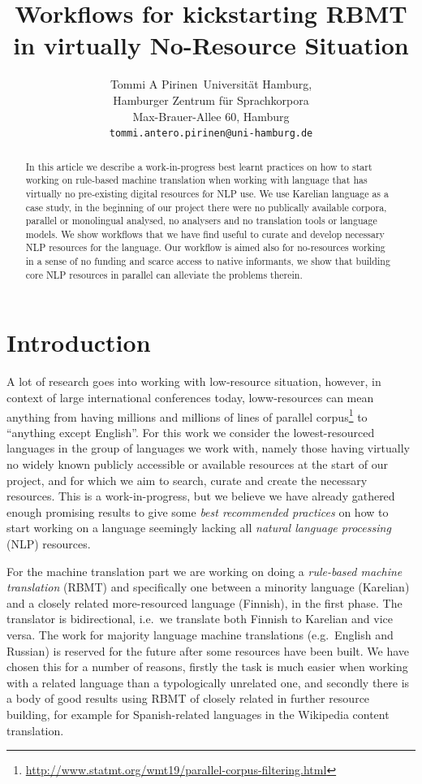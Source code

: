 \documentclass{flammie}
\title{Workflows for kickstarting RBMT in virtually No-Resource Situation}
\author{Tommi A Pirinen\
  Universität Hamburg,\\
  Hamburger Zentrum für Sprachkorpora\\
  Max-Brauer-Allee 60, Hamburg\\
  {\tt tommi.antero.pirinen@uni-hamburg.de}}
\date{}
\begin{document}
\maketitle
\begin{abstract}
    In this article we describe a work-in-progress best learnt practices on how
    to start working on rule-based machine translation when working with
    language that has virtually no pre-existing digital resources for NLP use.
    We use Karelian language as a case study, in the beginning of our project
    there were no publically available corpora, parallel or monolingual
    analysed, no analysers and no translation tools or language models. We show
    workflows that we have find useful to curate and develop necessary NLP
    resources for the language. Our workflow is aimed also for no-resources
    working in a sense of no funding and scarce access to native informants, we
    show that building core NLP resources in parallel can alleviate the problems
    therein.
\end{abstract}

\section{Introduction}

A lot of research goes into working with low-resource situation, however, in 
context of large international conferences today, loww-resources can mean
anything from having millions and millions of lines of parallel
corpus\footnote{\url{http://www.statmt.org/wmt19/parallel-corpus-filtering.html}}
to ``anything except English''. For this work we consider the lowest-resourced
languages in the group of languages we work with, namely those having virtually
no widely known publicly accessible or available resources at the start of our
project, and for which we aim to search, curate and create the necessary
resources. This is a work-in-progress, but we believe we have already gathered
enough promising results to give some \textit{best recommended practices} on
how to start working on a language seemingly lacking all \textit{natural
language processing} (NLP) resources.

For the machine translation part we are working on doing a \textit{rule-based
machine translation} (RBMT) and specifically one between a minority language
(Karelian) and a closely related more-resourced language (Finnish), in the first
phase. The translator is bidirectional, i.e.\ we translate both Finnish to
Karelian and vice versa.  The work for majority language machine translations
(e.g.\ English and Russian) is reserved for the future after some resources have
been built.  We have chosen this for a number of reasons, firstly the task is
much easier when working with a related language than a typologically unrelated
one, and secondly there is a body of good results using RBMT of closely related
in further resource building, for example for Spanish-related languages in the
Wikipedia content translation.
\end{document}
